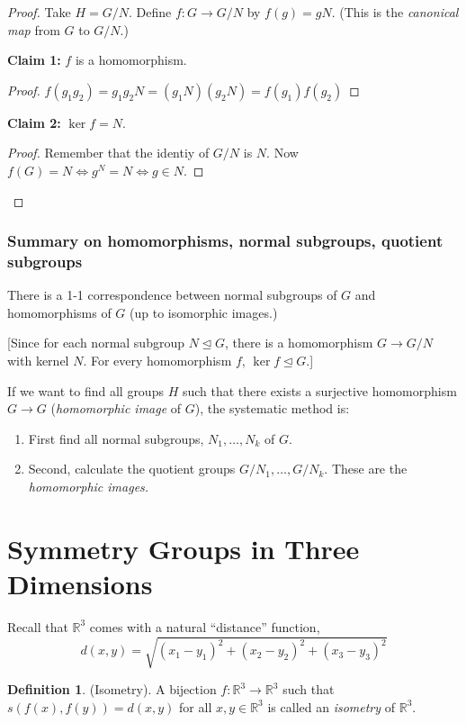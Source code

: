 \documentclass{article}
\theoremstyle{definition}
\newtheorem{definition}{Definition}
\newcommand{\reals}{\mathbb{R}}
\begin{document}
  \begin{proof}
    Take $H=G/N$. Define $f:G \rightarrow G/N$ by $f(g)=gN$. (This is the \textit{canonical map} from $G$ to $G/N$.)

    \textbf{Claim 1:} $f$ is a homomorphism.

    \begin{proof}
      $f(g_1g_2)=g_1g_2N=(g_1N)(g_2N)=f(g_1)f(g_2)$
    \end{proof}

    \textbf{Claim 2:} $\ker f = N$.
    \begin{proof}
      Remember that the identiy of $G/N$ is $N$. Now $f(G)=N \iff g^N = N \iff g \in N$.
    \end{proof}
  \end{proof}

  \subsubsection*{Summary on homomorphisms, normal subgroups, quotient subgroups}
  There is a 1-1 correspondence between normal subgroups of $G$ and homomorphisms
  of $G$ (up to isomorphic images.)

  [Since for each normal subgroup $N \trianglelefteq G$, there is a homomorphism $G \rightarrow G/N$ with kernel $N$. For every homomorphism $f$, $\ker f \trianglelefteq G$.]

  If we want to find all groups $H$ such that there exists a surjective homomorphism
  $G \rightarrow G$ (\textit{homomorphic image} of $G$), the systematic method is:
  \begin{enumerate}
    \item First find all normal subgroups, $N_1, \dots, N_k$ of $G$.
    \item Second, calculate the quotient groups $G/N_1, \dots, G/N_k$. These are the \textit{homomorphic images.}
  \end{enumerate}

  \section{Symmetry Groups in Three Dimensions}

  Recall that $\reals^3$  comes with a natural ``distance'' function,
  \[
    d(x,y)=\sqrt{(x_1 - y_1)^2 + (x_2 - y_2)^2 + (x_3 - y_3)^2}
  \]

  \begin{definition}
    (Isometry). A bijection $f:\reals^3 \rightarrow \reals^3$ such that $s(f(x),f(y))=d(x,y)$ for all $x,y \in \reals^3$ is called an \textit{isometry} of $\reals^3$.
  \end{definition}
\end{document}

